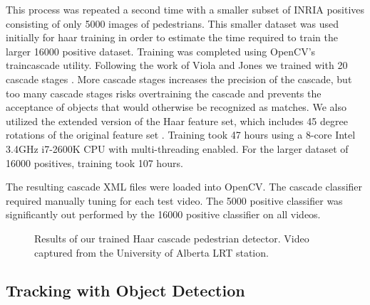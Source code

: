 \documentclass[12pt, onecolumn, conference]{IEEEtran}
\begin{document}
This process was repeated a second time with a smaller subset of INRIA positives consisting of only 5000 images of pedestrians. This smaller dataset was used initially for haar training in order to estimate the time required to train the larger 16000 positive dataset. Training was completed using OpenCV’s traincascade utility. Following the work of Viola and Jones we trained with 20 cascade stages \cite{P. Viola}. More cascade stages increases the precision of the cascade, but too many cascade stages risks overtraining the cascade and prevents the acceptance of objects that would otherwise be recognized as matches. We also utilized the extended version of the Haar feature set, which includes 45 degree rotations of the original feature set \cite{R. Lienhart 2}. Training took 47 hours using a 8-core Intel 3.4GHz i7-2600K CPU with multi-threading enabled. For the larger dataset of 16000 positives, training took 107 hours. 

The resulting cascade XML files were loaded into OpenCV. The cascade classifier required manually tuning for each test video. The 5000 positive classifier was significantly out performed by the 16000 positive classifier on all videos. 

\begin{figure}[!t]
\centering
\centering
{}
\hfil
{}
\caption{Results of our trained Haar cascade pedestrian detector. Video captured from the University of Alberta LRT station.}
\label{Object_Detection}
\end{figure}

\subsection{Tracking with Object Detection}
\end{document}
